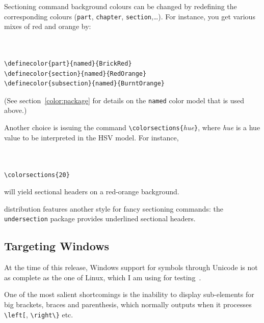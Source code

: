 Sectioning command background colours can be changed by
redefining the corresponding colours (\texttt{part}, \texttt{chapter},
\texttt{section},\ldots).
For instance, you get various mixes of red and orange by:
\begin{verbatim}


\definecolor{part}{named}{BrickRed}
\definecolor{section}{named}{RedOrange}
\definecolor{subsection}{named}{BurntOrange}
\end{verbatim}
(See section~\ref{color:package} for details on the \texttt{named}
color model that is used above.)

Another choice is issuing the command
\verb+\colorsections{+\textit{hue}\verb+}+, where
\textit{hue} is a hue value to be interpreted in the HSV model.
For instance,
\begin{verbatim}


\colorsections{20}
\end{verbatim}
will yield sectional headers on a red-orange background.

\hevea{} distribution features another style for fancy sectioning commands:
the \texttt{undersection} package provides underlined sectional headers.

\subsection{Targeting \label{winfonts}Windows}
%
At the time of this release, Windows support for symbols
through Unicode is not as complete as the one of Linux, which I am
using for testing~\hevea{}.

One of the most salient shortcomings is the inability to display sub-elements
for big brackets, braces and parenthesis, which \hevea{} normally
outputs when it processes \verb+\left[+, \verb+\right\}+ etc.


